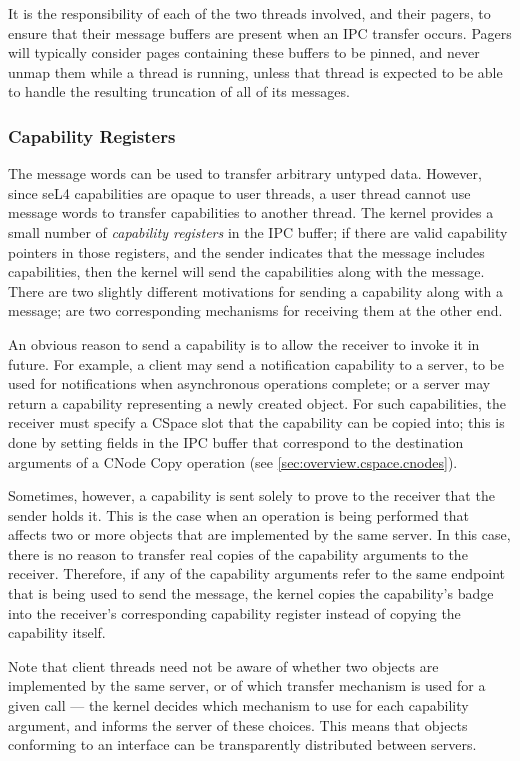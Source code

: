 It is the responsibility of each of the two
threads involved, and their pagers, to ensure that their message buffers are
present when an IPC transfer occurs. Pagers will typically consider pages
containing these buffers to be pinned, and never unmap them while a thread is
running, unless that thread is expected to be able to handle the resulting
truncation of all of its messages.

\subsubsection{Capability Registers}

The message words can be used to transfer arbitrary untyped data. However, since seL4 capabilities are opaque to user threads, a user thread cannot use message words to transfer capabilities to another thread. The kernel provides a small number of \emph{capability registers} in the IPC buffer; if there are valid capability pointers in those registers, and the sender indicates that the message includes capabilities, then the kernel will send the capabilities along with the message. There are two slightly different motivations for sending a capability along with a message; are two corresponding mechanisms for receiving them at the other end.

An obvious reason to send a capability is to allow the receiver to invoke it in future. For example, a client may send a notification capability to a server, to be used for notifications when asynchronous operations complete; or a server may return a capability representing a newly created object. For such capabilities, the receiver must specify a CSpace slot that the capability can be copied into; this is done by setting fields in the IPC buffer that correspond to the destination arguments of a CNode Copy operation (see \autoref{sec:overview.cspace.cnodes}).

Sometimes, however, a capability is sent solely to prove to the receiver that the sender holds it. This is the case when an operation is being performed that affects two or more objects that are implemented by the same server. In this case, there is no reason to transfer real copies of the capability arguments to the receiver. Therefore, if any of the capability arguments refer to the same endpoint that is being used to send the message, the kernel copies the capability's badge into the receiver's corresponding capability register instead of copying the capability itself.

Note that client threads need not be aware of whether two objects are implemented by the same server, or of which transfer mechanism is used for a given call --- the kernel decides which mechanism to use for each capability argument, and informs the server of these choices. This means that objects conforming to an interface can be transparently distributed between servers.

